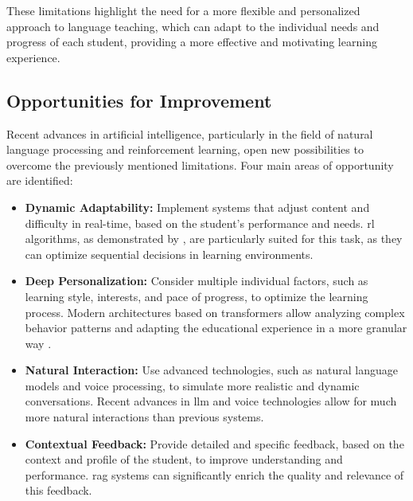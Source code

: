 These limitations highlight the need for a more flexible and personalized approach to language teaching, which can adapt to the individual needs and progress of each student, providing a more effective and motivating learning experience.

\subsection{Opportunities for Improvement}
\label{subsec:opportunities-for-improvement}

Recent advances in artificial intelligence, particularly in the field of natural language processing and reinforcement learning, open new possibilities to overcome the previously mentioned limitations. Four main areas of opportunity are identified:

\begin{itemize}
  \item \textbf{Dynamic Adaptability:} Implement systems that adjust content and difficulty in real-time, based on the student's performance and needs. \gls{rl} algorithms, as demonstrated by \cite{williams2017educational}, are particularly suited for this task, as they can optimize sequential decisions in learning environments.
  
  \item \textbf{Deep Personalization:} Consider multiple individual factors, such as learning style, interests, and pace of progress, to optimize the learning process. Modern architectures based on \gls{transformers} allow analyzing complex behavior patterns and adapting the educational experience in a more granular way \cite{vaswani2017attention}.
  
  \item \textbf{Natural Interaction:} Use advanced technologies, such as natural language models and voice processing, to simulate more realistic and dynamic conversations. Recent advances in \gls{llm} \cite{brown2020language} and voice technologies \cite{graves2013speech} allow for much more natural interactions than previous systems.
  
  \item \textbf{Contextual Feedback:} Provide detailed and specific feedback, based on the context and profile of the student, to improve understanding and performance. \gls{rag} systems \cite{lewis2020retrieval} can significantly enrich the quality and relevance of this feedback.
\end{itemize}

